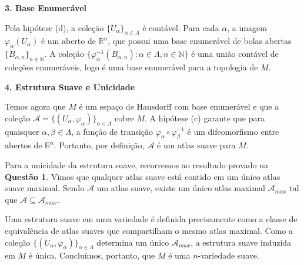 {	\textbf{3. Base Enumerável}
	
	Pela hipótese (d), a coleção $\{U_\alpha\}_{\alpha \in \Lambda}$ é contável. Para cada $\alpha$, a imagem $\varphi_\alpha(U_\alpha)$ é um aberto de $\mathbb{R}^n$, que possui uma base enumerável de bolas abertas $\{B_{\alpha, n}\}_{n \in \mathbb{N}}$. A coleção $\{\varphi_\alpha^{-1}(B_{\alpha, n}) : \alpha \in \Lambda, n \in \mathbb{N}\}$ é uma união contável de coleções enumeráveis, logo é uma base enumerável para a topologia de $M$.
	
	\textbf{4. Estrutura Suave e Unicidade}
	
	Temos agora que $M$ é um espaço de Hausdorff com base enumerável e que a coleção $\mathcal{A} = \{(U_\alpha, \varphi_\alpha)\}_{\alpha \in \Lambda}$ cobre $M$. A hipótese (c) garante que para quaisquer $\alpha, \beta \in \Lambda$, a função de transição $\varphi_\alpha \circ \varphi_\beta^{-1}$ é um difeomorfismo entre abertos de $\mathbb{R}^n$. Portanto, por definição, $\mathcal{A}$ é um atlas suave para $M$.
	
	Para a unicidade da estrutura suave, recorremos ao resultado provado na \textbf{Questão 1}. Vimos que qualquer atlas suave está contido em um único atlas suave maximal. Sendo $\mathcal{A}$ um atlas suave, existe um único atlas maximal $\mathcal{A}_{max}$ tal que $\mathcal{A} \subseteq \mathcal{A}_{max}$. 
	
	Uma estrutura suave em uma variedade é definida precisamente como a classe de equivalência de atlas suaves que compartilham o mesmo atlas maximal. Como a coleção $\{(U_\alpha, \varphi_\alpha)\}_{\alpha \in \Lambda}$ determina um único $\mathcal{A}_{max}$, a estrutura suave induzida em $M$ é única. Concluímos, portanto, que $M$ é uma $n$-variedade suave.
}
